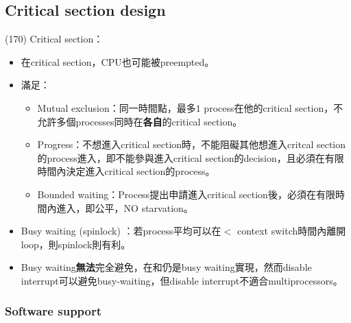 \subsection{Critical section design}

\begin{theorem}{(170)} Critical section： \begin{itemize}
        \item 在critical section，CPU也可能被preempted。
        \item 滿足：\begin{itemize}
            \item Mutual exclusion：同一時間點，最多$1$ process在他的critical section，不允許多個processes同時在\textbf{各自}的critical section。
            \item Progress：不想進入critical section時，不能阻礙其他想進入critcal section的process進入，即不能參與進入critical section的decision，且必須在有限時間內決定進入critical section的process。
            \item Bounded waiting：Process提出申請進入critical section後，必須在有限時間內進入，即公平，NO starvation。
        \end{itemize}
        \item Busy waiting (spinlock) ：若process平均可以在$<$ context switch時間內離開loop，則spinlock則有利。
        \item Busy waiting\textbf{無法}完全避免，在和仍是busy waiting實現，然而disable interrupt可以避免busy-waiting，但disable interrupt不適合multiprocessors。
    \end{itemize}
\end{theorem}

\subsubsection{Software support}


